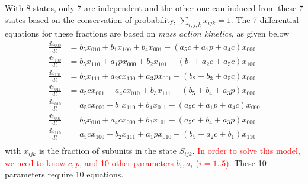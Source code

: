 With 8 states, only 7 are independent and the other one can induced
from these 7 states based on the conservation of probability,
$\sum_{i,j,k}x_{ijk} = 1$. The 7 differential equations for these
fractions are based on {\it mass action kinetics}, as given below
\begin{equation}
  \label{eq:292}
  \begin{split}
    \frac{dx_{000}}{dt} &= b_{5}x_{010} + b_{1}x_{100} +
    b_{4}x_{001} - (a_5c+a_1p+a_4c)x_{000} \\
    \frac{dx_{100}}{dt} &= b_{5}x_{110} + a_{1}px_{000} +
    b_{2}x_{101} - (b_1+a_2c+a_5c)x_{100} \\
    \frac{dx_{101}}{dt} &= b_{5}x_{111} + a_{2}cx_{100} +
    a_{3}px_{001} - (b_2+b_3+a_5c)x_{000} \\
    \frac{dx_{011}}{dt} &= a_{5}cx_{001} + a_4cx_{010} +
    b_{3}x_{111} - (b_5+b_4+a_3p)x_{000} \\
    \frac{dx_{010}}{dt} &= a_{5}cx_{000} + b_{1}x_{110} +
    b_{4}x_{011} - (a_5c+a_1p+a_4c)x_{000} \\
    \frac{dx_{001}}{dt} &= b_{5}x_{010} + a_{4}cx_{000} +
    b_{3}x_{101} - (a_5c+b_4+a_3p)x_{000} \\
     \frac{dx_{110}}{dt} &= a_5cx_{100} + b_{2}x_{111} + a_1px_{010} -(b_{5}+a_2c+b_{1})x_{110} \\
  \end{split}
\end{equation}
with $x_{ijk}$ is the fraction of subunits in the state $S_{ijk}$.
\textcolor{red}{In order to solve this model, we need to know $c,p$,
  and 10 other parameters $b_i,a_i$ ($i=1..5$)}. These 10 parameters
require 10 equations.

